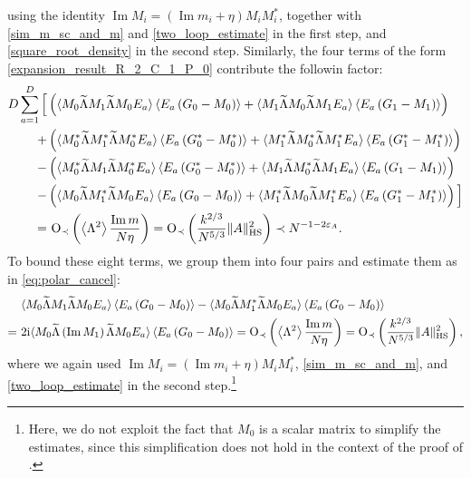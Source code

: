 \documentclass[10pt,reqno]{amsart}
\numberwithin{equation}{section}
\numberwithin{figure}{section}
\theoremstyle{plain} %
\theoremstyle{definition} %
\newcommand{\wt}{\widetilde}
\renewcommand{\txt}[1]{\text{\rm{#1}}}
\newcommand{\ii}{\mathrm{i}}
\newcommand{\pa}[1]{\left({#1}\right)}
\newcommand{\norm}[1]{\lVert #1 \rVert}
\newcommand{\avg}[1]{\langle #1 \rangle}
\newcommand{\avga}[1]{\left\langle #1 \right\rangle}
\DeclareMathOperator{\im}{\mathrm{Im}}
\newcommand{\tLambda}{{\wt{\Lambda}}}
\newcommand{\HS}{\txt{HS}}
\newcommand{\dsum}[1]{\sum_{#1=1}^D}
\newcommand{\opr}[1]{\mathrm{O}_\prec\left({#1}\right)}
\numberwithin{equation}{section}
\begin{document}
      using the identity $\im M_i=\pa{\im m_i+\eta}M_iM_i^*$, together with \eqref{sim_m_sc_and_m} and \eqref{two_loop_estimate} in the first step, and \eqref{square_root_density} in the second step.   Similarly, the four terms of the form \eqref{expansion_result_R_2_C_1_P_0} contribute the followin factor:  
      \begin{equation}\label{cancellation_im_example}
          \begin{aligned}
              D\dsum{a}\Big[&\pa{\avg{M_0\tLambda M_1\tLambda M_0E_a}\avga{E_a\pa{G_0-M_0}}+\avg{M_1\tLambda M_0\tLambda M_1 E_a}\avga{E_a\pa{G_1-M_1}}}\\
              +&\pa{\avg{M_0^*\tLambda M_1^*\tLambda M_0^*E_a}\avga{E_a\pa{G_0^*-M_0^*}}+\avg{M_1^*\tLambda M_0^*\tLambda M_1^* E_a}\avga{E_a\pa{G_1^*-M_1^*}}}\\
              -& \pa{\avg{M_0^*\tLambda M_1\tLambda M_0^*E_a}\avga{E_a\pa{G_0^*-M_0^*}}+\avg{M_1\tLambda M_0^*\tLambda M_1 E_a}\avga{E_a\pa{G_1-M_1}}}\\
              -&\pa{\avg{M_0\tLambda M_1^*\tLambda M_0 E_a}\avga{E_a\pa{G_0-M_0}}+\avg{M_1^*\tLambda M_0\tLambda M_1^* E_a}\avga{E_a\pa{G_1^*-M_1^*}}}\Big]\\
              =&~ \opr{\avga{\Lambda^2}\frac{\im m}{N\eta}}=\opr{\frac{k^{2/3}}{N^{5/3}}\norm{A}_{\HS}^2}\prec N^{-1-2\varepsilon_A}.
          \end{aligned}
      \end{equation}
  To bound these eight terms, we group them into four pairs and estimate them as in \eqref{eq:polar_cancel}:
      \begin{equation}\label{eq:polar2}
          \begin{aligned}
              &~\avg{M_0\tLambda M_1\tLambda M_0E_a}\avga{E_a\pa{G_0-M_0}}-\avg{M_0\tLambda M_1^*\tLambda M_0 E_a}\avga{E_a\pa{G_0-M_0}}\\
              =&~2\ii\avg{M_0\tLambda \pa{\im M_1}\tLambda M_0 E_a}\avga{E_a\pa{G_0-M_0}}=\opr{\avga{\Lambda^2}\frac{\im m}{N\eta}}=\opr{\frac{k^{2/3}}{N^{5/3}}\norm{A}_{\HS}^2},
          \end{aligned}
      \end{equation}
      where we again used $\im M_i=\pa{\im m_i+\eta}M_iM_i^*$, \eqref{sim_m_sc_and_m}, and \eqref{two_loop_estimate} in the second step.\footnote{Here, we do not exploit the fact that $M_0$ is a scalar matrix to simplify the estimates, since this simplification does not hold in the context of the proof of .}
      	
\end{document}
